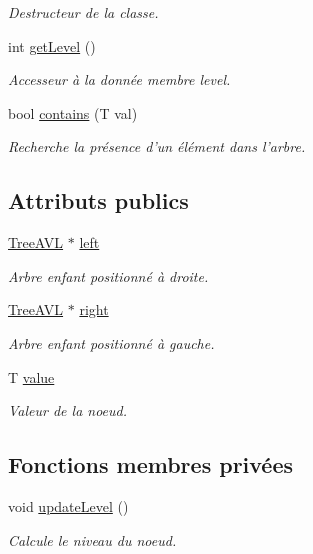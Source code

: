 \begin{DoxyCompactItemize}
\begin{DoxyCompactList}\small\item\em Destructeur de la classe. \end{DoxyCompactList}\item 
int \hyperlink{class_tree_a_v_l_a92bb11a553775814dfee115f2aa5e16d}{get\-Level} ()
\begin{DoxyCompactList}\small\item\em Accesseur à la donnée membre level. \end{DoxyCompactList}\item 
bool \hyperlink{class_tree_a_v_l_a7f5167c9fbbbb74301698fb96194d66d}{contains} (T val)
\begin{DoxyCompactList}\small\item\em Recherche la présence d'un élément dans l'arbre. \end{DoxyCompactList}\end{DoxyCompactItemize}
\subsection*{Attributs publics}
\begin{DoxyCompactItemize}
\item 
\hyperlink{class_tree_a_v_l}{Tree\-A\-V\-L} $\ast$ \hyperlink{class_tree_a_v_l_aeffecf910a25fcd4a2ec1f568db34935}{left}
\begin{DoxyCompactList}\small\item\em Arbre enfant positionné à droite. \end{DoxyCompactList}\item 
\hyperlink{class_tree_a_v_l}{Tree\-A\-V\-L} $\ast$ \hyperlink{class_tree_a_v_l_aa66f75a7f4a244d08beaaf100987ccc1}{right}
\begin{DoxyCompactList}\small\item\em Arbre enfant positionné à gauche. \end{DoxyCompactList}\item 
T \hyperlink{class_tree_a_v_l_a334f2f454d7d64bdc3271fd55d0bda94}{value}
\begin{DoxyCompactList}\small\item\em Valeur de la noeud. \end{DoxyCompactList}\end{DoxyCompactItemize}
\subsection*{Fonctions membres privées}
\begin{DoxyCompactItemize}
\item 
void \hyperlink{class_tree_a_v_l_a3ce7e7ba815fbcc2be3b439334d03bec}{update\-Level} ()
\begin{DoxyCompactList}\small\item\em Calcule le niveau du noeud. \end{DoxyCompactList}\end{DoxyCompactItemize}
